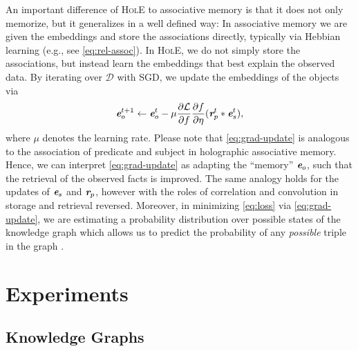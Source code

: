 \documentclass[letterpaper]{article}
\renewcommand{\vec}[1]{\textit{\textbf{#1}}}
\newcommand{\ve}{\vec{e}}
\newcommand{\vr}{\vec{r}}
\newcommand{\cconv}{\ast}
\newcommand{\hole}{\textsc{HolE}\xspace}
\newcommand{\Set}[1]{\mathcal{#1}}
\newcommand{\loss}{\mathcal{L}}
\begin{document}
An important difference of \hole to associative memory is that 
it does not only memorize, but it generalizes in a well defined way:
In associative memory we are given the embeddings and store the associations
directly, typically via Hebbian learning (e.g., see \cref{eq:rel-assoc}). 
In \hole, we do not simply store the associations, but instead 
learn the embeddings that best explain the observed data. 
By iterating over $\Set{D}$ with SGD, we update the
embeddings of the objects via
\begin{equation}
  \label{eq:grad-update}
  \ve_o^{t+1} \gets \ve_o^t - \mu \frac{\partial \loss}{\partial f}\frac{\partial f}{\partial \eta}( \vr_p^t
  \cconv \ve_s^t),
\end{equation}
where $\mu$ denotes the learning rate.
Please note that \cref{eq:grad-update} is analogous to the association of
predicate and subject in holographic associative memory.
Hence, we can interpret \cref{eq:grad-update} as adapting the ``memory''
$\ve_o$, such that the retrieval of the observed facts is improved. The same
analogy holds for the updates of $\ve_s$ and $\vr_p$, however with the roles of
correlation and convolution in storage and retrieval reversed.
Moreover, in minimizing \cref{eq:loss} via \cref{eq:grad-update}, 
we are estimating a probability distribution over possible states of the
knowledge graph which allows us to predict the probability of any
\emph{possible} triple in the graph \cite{nickel2015review}.


\section{Experiments}

\subsection{Knowledge Graphs}
\label{sec:exp-lp}
\end{document}
